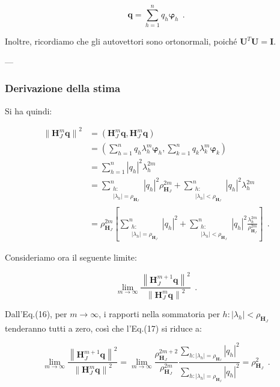 \[
\mathbf{q} = \sum_{h=1}^{n} q_h \mathbf{\varphi}_h\ \ . 
\]

Inoltre, ricordiamo che gli autovettori sono ortonormali, poiché \(\mathbf{U}^T \mathbf{U} = \mathbf{I}\).

---

\subsubsection{Derivazione della stima}

Si ha quindi:

\[
\begin{aligned}
	\left\| \mathbf{H}_J^m \mathbf{q} \right\|^2 &= \left( \mathbf{H}_J^m \mathbf{q}, \mathbf{H}_J^m \mathbf{q} \right) \\
	&= \left( \sum_{h=1}^{n} q_h \lambda_h^m \mathbf{\varphi}_h, \sum_{k=1}^{n} q_k \lambda_k^m \mathbf{\varphi}_k \right) \\
	&= \sum_{h=1}^{n} |q_h|^2 \lambda_h^{2m} \\
	&= \sum_{\substack{h: \\ |\lambda_h| = \rho_{\mathbf{H}_J}}}^n |q_h|^2 \rho_{\mathbf{H}_J}^{2m} + \sum_{\substack{h: \\ |\lambda_h| < \rho_{\mathbf{H}_J}}}^n |q_h|^2 \lambda_h^{2m} \\
	&= \rho_{\mathbf{H}_J}^{2m} \left[ \sum_{\substack{h: \\ |\lambda_h| = \rho_{\mathbf{H}_J}}}^n |q_h|^2 + \sum_{\substack{h: \\ |\lambda_h| < \rho_{\mathbf{H}_J}}}^n |q_h|^2 \frac{\lambda_h^{2m}}{\rho_{\mathbf{H}_J}^{2m}} \right]\ \ . 
\end{aligned}
\]

Consideriamo ora il seguente limite:

\[
\lim_{m \to \infty} \frac{\left\| \mathbf{H}_J^{m+1} \mathbf{q} \right\|^2}{\left\| \mathbf{H}_J^m \mathbf{q} \right\|^2}\ \ . 
\]

Dall'Eq.(16), per \(m \to \infty\), i rapporti nella sommatoria per \(h: |\lambda_h| < \rho_{\mathbf{H}_J}\) tenderanno tutti a zero, così che l'Eq.(17) si riduce a:

\[
\lim_{m \to \infty} \frac{\left\| \mathbf{H}_J^{m+1} \mathbf{q} \right\|^2}{\left\| \mathbf{H}_J^m \mathbf{q} \right\|^2} = \lim_{m \to \infty} \frac{\rho_{\mathbf{H}_J}^{2m+2}}{\rho_{\mathbf{H}_J}^{2m}} \frac{\sum_{h: |\lambda_h| = \rho_{\mathbf{H}_J}} |q_h|^2}{\sum_{h: |\lambda_h| = \rho_{\mathbf{H}_J}} |q_h|^2} = \rho_{\mathbf{H}_J}^2\ \ . 
\]


